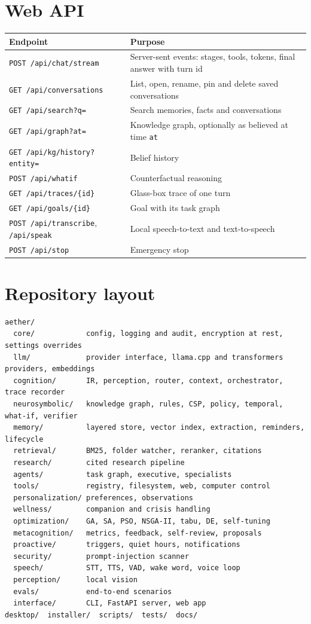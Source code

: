 \documentclass[11pt,a4paper]{article}
\newcommand{\code}[1]{\texttt{#1}}
\begin{document}
\appendix
\section{Web API}
\begin{center}
\small
\begin{tabularx}{\linewidth}{@{}l X@{}}
\toprule
Endpoint & Purpose \\
\midrule
\code{POST /api/chat/stream} & Server-sent events: stages, tools, tokens, final answer with turn id \\
\code{GET /api/conversations} & List, open, rename, pin and delete saved conversations \\
\code{GET /api/search?q=} & Search memories, facts and conversations \\
\code{GET /api/graph?at=} & Knowledge graph, optionally as believed at time \code{at} \\
\code{GET /api/kg/history?entity=} & Belief history \\
\code{POST /api/whatif} & Counterfactual reasoning \\
\code{GET /api/traces/\{id\}} & Glass-box trace of one turn \\
\code{GET /api/goals/\{id\}} & Goal with its task graph \\
\code{POST /api/transcribe}, \code{/api/speak} & Local speech-to-text and text-to-speech \\
\code{POST /api/stop} & Emergency stop \\
\bottomrule
\end{tabularx}
\end{center}

\section{Repository layout}
\begin{lstlisting}
aether/
  core/            config, logging and audit, encryption at rest, settings overrides
  llm/             provider interface, llama.cpp and transformers providers, embeddings
  cognition/       IR, perception, router, context, orchestrator, trace recorder
  neurosymbolic/   knowledge graph, rules, CSP, policy, temporal, what-if, verifier
  memory/          layered store, vector index, extraction, reminders, lifecycle
  retrieval/       BM25, folder watcher, reranker, citations
  research/        cited research pipeline
  agents/          task graph, executive, specialists
  tools/           registry, filesystem, web, computer control
  personalization/ preferences, observations
  wellness/        companion and crisis handling
  optimization/    GA, SA, PSO, NSGA-II, tabu, DE, self-tuning
  metacognition/   metrics, feedback, self-review, proposals
  proactive/       triggers, quiet hours, notifications
  security/        prompt-injection scanner
  speech/          STT, TTS, VAD, wake word, voice loop
  perception/      local vision
  evals/           end-to-end scenarios
  interface/       CLI, FastAPI server, web app
desktop/  installer/  scripts/  tests/  docs/
\end{lstlisting}
\end{document}
